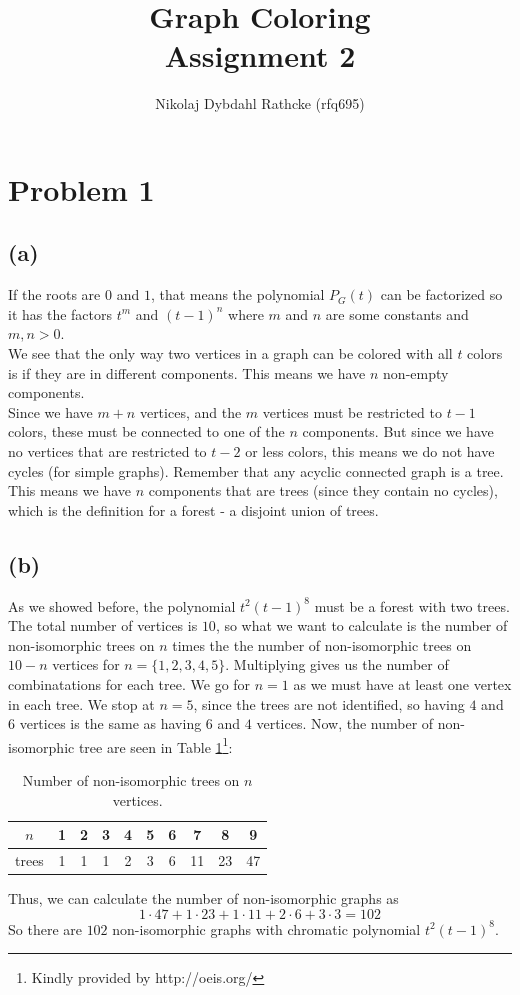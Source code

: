 \documentclass[a4paper]{article}
\author{Nikolaj Dybdahl Rathcke (rfq695)}
\title{Graph Coloring \\ Assignment 2}
\begin{document}
\maketitle

\section{Problem 1}
\subsection{(a)}
If the roots are $0$ and $1$, that means the polynomial $P_G(t)$ can be factorized so it has the factors $t^m$ and $(t-1)^n$ where $m$ and $n$ are some constants and $m,n>0$. \\
We see that the only way two vertices in a graph can be colored with all $t$ colors is if they are in different components. This means we have $n$ non-empty components. \\
Since we have $m+n$ vertices, and the $m$ vertices must be restricted to $t-1$ colors, these must be connected to one of the $n$ components. But since we have no vertices that are restricted to $t-2$ or less colors, this means we do not have cycles (for simple graphs). Remember that any acyclic connected graph is a tree. This means we have $n$ components that are trees (since they contain no cycles), which is the definition for a forest - a disjoint union of trees.

\subsection{(b)}
As we showed before, the polynomial $t^2(t-1)^8$ must be a forest with two trees. The total number of vertices is $10$, so what we want to calculate is the number of non-isomorphic trees on $n$ times the the number of non-isomorphic trees on $10-n$ vertices for $n=\{1,2,3,4,5\}$. Multiplying gives us the number of combinatations for each tree. We go for $n=1$ as we must have at least one vertex in each tree. We stop at $n=5$, since the trees are not identified, so having $4$ and $6$ vertices is the same as having $6$ and $4$ vertices. Now, the number of non-isomorphic tree are seen in Table \ref{tab1}\footnote{Kindly provided by http://oeis.org/}:
\begin{table}[H]
  \centering
  \begin{tabular}{|c|c|c|c|c|c|c|c|c|c|}
    \hline
    $n$ & 1 &  2 & 3 & 4 & 5 & 6 & 7 & 8 & 9 \\
    \hline
    trees & 1 & 1 & 1 & 2 & 3 & 6 & 11 & 23 & 47 \\
    \hline
  \end{tabular}
  \caption{Number of non-isomorphic trees on $n$ vertices.}
  \label{tab1}
\end{table}
Thus, we can calculate the number of non-isomorphic graphs as
$$
1\cdot 47 + 1\cdot 23 + 1\cdot 11 + 2\cdot 6 + 3\cdot 3 = 102
$$
So there are $102$ non-isomorphic graphs with chromatic polynomial $t^2(t-1)^8$.
\end{document}
